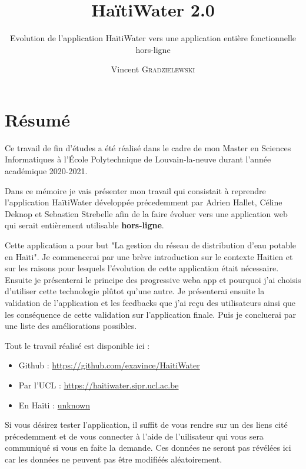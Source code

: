 \documentclass{EPL-master-thesis-covers-FR}
\title{HaïtiWater 2.0}
\subtitle{Evolution de l'application HaïtiWater vers une application entière  fonctionnelle hors-ligne}
\author{Vincent \textsc{Gradzielewski}}%
\begin{document}
	\maketitle
	\tableofcontents

	\setlength{\parskip}{1.5em plus1em minus1em}


	\chapter*{Résumé}
	
		Ce travail de fin d'études a été réalisé dans le cadre de mon Master en Sciences Informatiques à l'École Polytechnique de Louvain-la-neuve durant l'année académique 2020-2021.
		
		Dans ce mémoire je vais présenter mon travail qui consistait à reprendre l'application HaïtiWater développée précedemment par Adrien Hallet, Céline Deknop et Sebastien Strebelle afin de la faire évoluer vers une application web qui serait entièrement utilisable \textbf{hors-ligne}.
		 
		Cette application a pour but "La gestion du réseau de distribution d'eau potable en Haïti". Je commencerai par une brève introduction sur le contexte Haitien et sur les raisons pour lesquels l'évolution de cette application était nécessaire. Ensuite je présenterai le principe des progressive weba app et pourquoi j'ai choisis d'utiliser cette technologie plûtot qu'une autre. Je présenterai ensuite la validation de l'application et les feedbacks que j'ai reçu des utilisateurs ainsi que les conséquence de cette validation sur l'application finale. Puis je concluerai par une liste des améliorations possibles.

		Tout le travail réalisé est disponible ici :

\begin{itemize}
	\item Github : \url{https://github.com/exavince/HaitiWater}
	\item Par l'UCL : \url{https://haitiwater.sipr.ucl.ac.be}
	\item En Haïti : \url{unknown}
\end{itemize}		

		Si vous désirez tester l'application, il suffit de vous rendre sur un des liens cité précedemment et de vous connecter à l'aide de l'uilisateur qui vous sera communiqué si vous en faite la demande. Ces données ne seront pas révélées ici car les données ne peuvent pas être modifiéés aléatoirement. 
		
\end{document}
